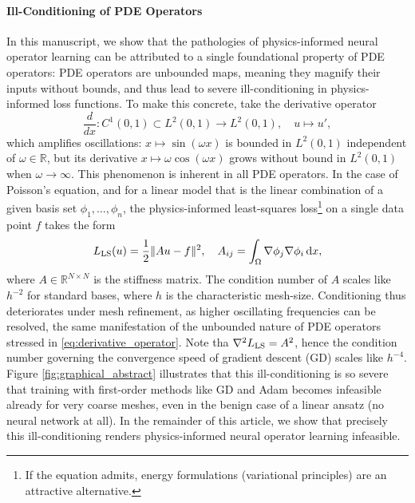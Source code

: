 \documentclass{article} %
\begin{document}
\paragraph{Ill-Conditioning of PDE Operators}
In this manuscript, we show that the pathologies of physics-informed neural operator learning can be attributed to a single foundational property of PDE operators: PDE operators are unbounded maps, meaning they magnify their inputs without bounds, and thus lead to severe ill-conditioning in physics-informed loss functions. To make this concrete, take the derivative operator
\begin{equation}\label{eq:derivative_operator}
   \frac{d}{dx}: C^1(0,1) \subset L^2(0,1) \to L^2(0,1), \quad u \mapsto u',
\end{equation}
which amplifies oscillations: $x\mapsto \sin(\omega x)$ is bounded in $L^2(0,1)$ independent of $\omega \in \mathbb R$, but its derivative $x\mapsto \omega \cos(\omega x)$ grows without bound in $L^2(0,1)$ when $\omega \to \infty$. This phenomenon is inherent in all PDE operators. In the case of Poisson's equation, and for a linear model that is the linear combination of a given basis set $\phi_1, \dots, \phi_n$, the physics-informed least-squares loss\footnote{If the equation admits, energy formulations (variational principles) are an attractive alternative.} on a single data point $f$ takes the form
\begin{equation}\label{eq:physics_informed_ls_loss_no_precond}
   L_{\textup{LS}}(u) = \frac12 \| Au - f \|^2, \quad A_{ij} = \int_\Omega \nabla \phi_j \nabla \phi_i\,\mathrm dx,
\end{equation}
where $A\in\mathbb R^{N\times N}$ is the stiffness matrix. The condition number of $A$ scales like $h^{-2}$ for standard bases, where $h$ is the characteristic mesh-size. Conditioning thus deteriorates under mesh refinement, as higher oscillating frequencies can be resolved, the same manifestation of the unbounded nature of PDE operators stressed in \ref{eq:derivative_operator}. Note tha $\nabla^2L_{\textup{LS}} = A^2$, hence the condition number governing the convergence speed of gradient descent (GD) scales like $h^{-4}$. Figure \ref{fig:graphical_abstract} illustrates that this ill-conditioning is so severe that training with first-order methods like GD and Adam becomes infeasible already for very coarse meshes, even in the benign case of a linear ansatz (no neural network at all). In the remainder of this article, we show that precisely this ill-conditioning renders physics-informed neural operator learning infeasible.
\end{document}
